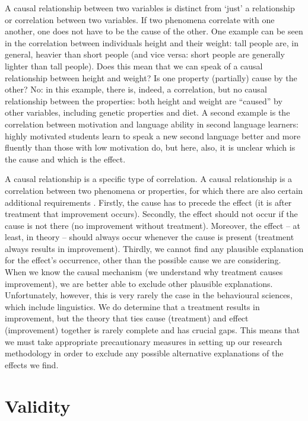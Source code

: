 \documentclass[
]{book}
\begin{document}
A causal relationship between two variables is distinct from `just' a relationship or correlation between two variables. If two phenomena correlate with one another, one does not have to be the cause of the other. One example can be seen in the correlation between individuals height and their weight: tall people are, in general, heavier than short people (and vice versa: short people are generally lighter than tall people). Does this mean that we can speak of a causal relationship between height and weight? Is one property (partially) cause by the other? No: in this example, there is, indeed, a correlation, but no causal relationship between the properties: both height and weight are ``caused'' by other variables, including genetic properties and diet. A second example is the correlation between motivation and language ability in second language learners: highly motivated students learn to speak a new second language better and more fluently than those with low motivation do, but here, also, it is unclear which is the cause and which is the effect.

A causal relationship is a specific type of correlation. A causal relationship is a correlation between two phenomena or properties, for which there are also certain additional requirements \citep{SCC02}.
Firstly, the cause has to precede the effect (it is after treatment that improvement occurs). Secondly, the effect should not occur if the cause is not there (no improvement without treatment).
Moreover, the effect -- at least, in theory -- should always occur whenever the cause is present (treatment always results in improvement).
Thirdly, we cannot find any plausible explanation for the effect's occurrence, other than the possible cause we are considering. When we know the causal mechanism (we understand why treatment causes improvement), we are better able to exclude other plausible explanations. Unfortunately, however, this is very rarely the case in the behavioural sciences, which include linguistics. We do determine that a treatment results in improvement, but the theory that ties cause (treatment) and effect (improvement) together is rarely complete and has crucial gaps. This means that we must take appropriate precautionary measures in setting up our research methodology in order to exclude any possible alternative explanations of the effects we find.

\section{Validity}\label{sec:validity}
\end{document}
